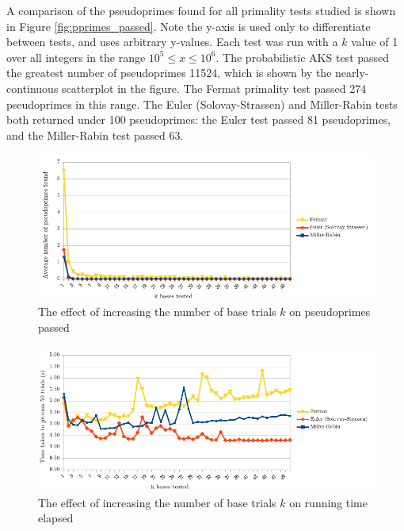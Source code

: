 \documentclass{article}
\begin{document}
A comparison of the pseudoprimes found for all primality tests studied is shown in Figure \ref{fig:pprimes_passed}. Note the y-axis is used only to differentiate between tests, and uses arbitrary y-values. Each test was run with a $k$ value of 1 over all integers in the range $10^5 \leq x \leq 10^6$. The probabilistic AKS test passed the greatest number of pseudoprimes 11524, which is shown by the nearly-continuous scatterplot in the figure. The Fermat primality test passed 274 pseudoprimes in this range. The Euler (Solovay-Strassen) and Miller-Rabin tests both returned under 100 pseudoprimes: the Euler test passed 81 pseudoprimes, and the Miller-Rabin test passed 63.

\FloatBarrier
\begin{figure}[h!]
\caption{The effect of increasing the number of base trials $k$ on pseudoprimes passed}
\label{fig:pprimes_v_bases}
\centering
\includegraphics[width=\textwidth]{pprimes_v_bases}
\end{figure}
\FloatBarrier

\FloatBarrier
\begin{figure}[h!]
\caption{The effect of increasing the number of base trials $k$ on running time elapsed}
\label{fig:time_v_bases}
\centering
\includegraphics[width=\textwidth]{time_v_bases}
\end{figure}
\FloatBarrier
\end{document}

